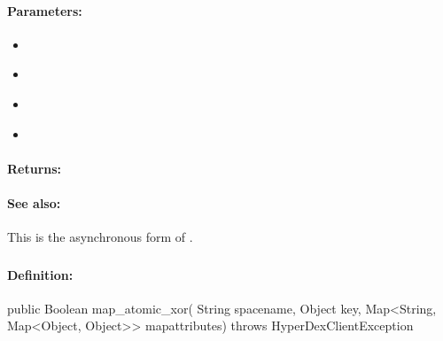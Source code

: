\paragraph{Parameters:}
\begin{itemize}[noitemsep]
\item {}\\

\item {}\\

\item {}\\

\item {}\\

\end{itemize}

\paragraph{Returns:}


\paragraph{See also:}  This is the asynchronous form of .

\pagebreak
\subsubsection{}
\label{api:java:map_atomic_xor}


\paragraph{Definition:}
\begin{javacode}
public Boolean map_atomic_xor(
        String spacename,
        Object key,
        Map<String, Map<Object, Object>> mapattributes) throws HyperDexClientException
\end{javacode}

